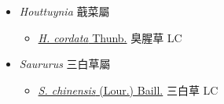 
  \begin{itemize}
 \item[] \textit{Houttuynia} 蕺菜屬
                                
  \begin{itemize}
        \item[] \href{http://www.theplantlist.org/tpl1.1/search?q=Houttuynia+cordata}{\textit{H. cordata} Thunb.}   臭腥草   LC
  \end{itemize}
 \item[] \textit{Saururus} 三白草屬
                                
  \begin{itemize}
        \item[] \href{http://www.theplantlist.org/tpl1.1/search?q=Saururus+chinensis}{\textit{S. chinensis} (Lour.) Baill.}   三白草   LC
  \end{itemize}
  \end{itemize}

